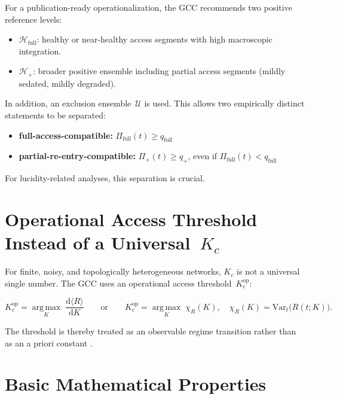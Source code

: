 \documentclass[11pt,a4paper]{article}
\theoremstyle{plain}
\theoremstyle{definition}
\theoremstyle{remark}
\newcommand{\Kcop}{K_c^{\mathrm{op}}}
\begin{document}
For a publication-ready operationalization, the GCC recommends two positive reference levels:

\begin{itemize}
\item $\mathcal{H}_{\mathrm{full}}$: healthy or near-healthy access segments with high macroscopic integration.
\item $\mathcal{H}_{+}$: broader positive ensemble including partial access segments (mildly sedated, mildly degraded).
\end{itemize}

In addition, an exclusion ensemble~$\mathcal{U}$ is used. This allows two empirically distinct statements to be separated:

\begin{itemize}
\item \textbf{full-access-compatible:} $\Pi_{\mathrm{full}}(t) \geq q_{\mathrm{full}}$
\item \textbf{partial-re-entry-compatible:} $\Pi_{+}(t) \geq q_{+}$, even if $\Pi_{\mathrm{full}}(t) < q_{\mathrm{full}}$
\end{itemize}

For lucidity-related analyses, this separation is crucial.


\section{Operational Access Threshold Instead of a Universal~$K_c$}
\label{sec:schwelle}

For finite, noisy, and topologically heterogeneous networks, $K_c$ is not a universal single number. The GCC uses an operational access threshold~$\Kcop$:

\begin{equation}
\label{eq:Kcop}
\Kcop = \operatorname*{arg\,max}_{K}\;\frac{\mathrm{d}\langle R \rangle}{\mathrm{d}K}
\qquad\text{or}\qquad
\Kcop = \operatorname*{arg\,max}_{K}\;\chi_R(K), \quad \chi_R(K) = \mathrm{Var}_t\!\bigl(R(t;K)\bigr).
\end{equation}

The threshold is thereby treated as an observable regime transition rather than as an a priori constant \citep{restrepo2005,arenas2008}.


\section{Basic Mathematical Properties}
\label{sec:grundsaetze}
\end{document}
